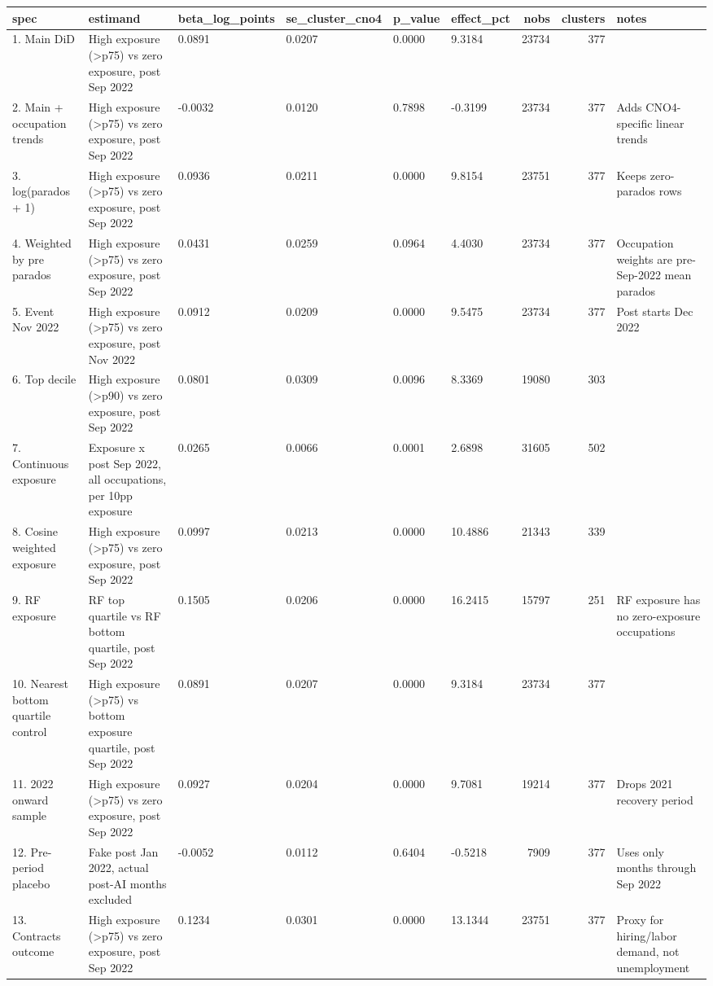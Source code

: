 \begin{tabular}{llllllrrl}
\toprule
spec & estimand & beta\_log\_points & se\_cluster\_cno4 & p\_value & effect\_pct & nobs & clusters & notes \\
\midrule
1. Main DiD & High exposure (>p75) vs zero exposure, post Sep 2022 & 0.0891 & 0.0207 & 0.0000 & 9.3184 & 23734 & 377 &  \\
2. Main + occupation trends & High exposure (>p75) vs zero exposure, post Sep 2022 & -0.0032 & 0.0120 & 0.7898 & -0.3199 & 23734 & 377 & Adds CNO4-specific linear trends \\
3. log(parados + 1) & High exposure (>p75) vs zero exposure, post Sep 2022 & 0.0936 & 0.0211 & 0.0000 & 9.8154 & 23751 & 377 & Keeps zero-parados rows \\
4. Weighted by pre parados & High exposure (>p75) vs zero exposure, post Sep 2022 & 0.0431 & 0.0259 & 0.0964 & 4.4030 & 23734 & 377 & Occupation weights are pre-Sep-2022 mean parados \\
5. Event Nov 2022 & High exposure (>p75) vs zero exposure, post Nov 2022 & 0.0912 & 0.0209 & 0.0000 & 9.5475 & 23734 & 377 & Post starts Dec 2022 \\
6. Top decile & High exposure (>p90) vs zero exposure, post Sep 2022 & 0.0801 & 0.0309 & 0.0096 & 8.3369 & 19080 & 303 &  \\
7. Continuous exposure & Exposure x post Sep 2022, all occupations, per 10pp exposure & 0.0265 & 0.0066 & 0.0001 & 2.6898 & 31605 & 502 &  \\
8. Cosine weighted exposure & High exposure (>p75) vs zero exposure, post Sep 2022 & 0.0997 & 0.0213 & 0.0000 & 10.4886 & 21343 & 339 &  \\
9. RF exposure & RF top quartile vs RF bottom quartile, post Sep 2022 & 0.1505 & 0.0206 & 0.0000 & 16.2415 & 15797 & 251 & RF exposure has no zero-exposure occupations \\
10. Nearest bottom quartile control & High exposure (>p75) vs bottom exposure quartile, post Sep 2022 & 0.0891 & 0.0207 & 0.0000 & 9.3184 & 23734 & 377 &  \\
11. 2022 onward sample & High exposure (>p75) vs zero exposure, post Sep 2022 & 0.0927 & 0.0204 & 0.0000 & 9.7081 & 19214 & 377 & Drops 2021 recovery period \\
12. Pre-period placebo & Fake post Jan 2022, actual post-AI months excluded & -0.0052 & 0.0112 & 0.6404 & -0.5218 & 7909 & 377 & Uses only months through Sep 2022 \\
13. Contracts outcome & High exposure (>p75) vs zero exposure, post Sep 2022 & 0.1234 & 0.0301 & 0.0000 & 13.1344 & 23751 & 377 & Proxy for hiring/labor demand, not unemployment \\
\bottomrule
\end{tabular}
